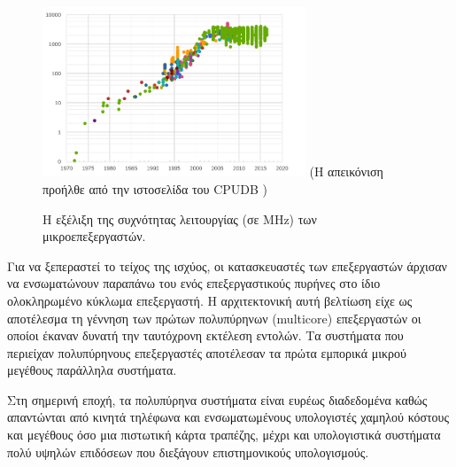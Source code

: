 \begin{figure}[t]
	\centering
	\includegraphics[width=0.7\textwidth]{Figures/cpudb.png}
	\linebreak 
	{\small (Η απεικόνιση προήλθε από την ιστοσελίδα του CPUDB \cite{danowitz2012cpu})}
	\caption{Η εξέλιξη της συχνότητας λειτουργίας (σε MHz) των μικροεπεξεργαστών.}
	\label{fig:CPUDB}
\end{figure}


Για να ξεπεραστεί το τείχος της ισχύος, οι κατασκευαστές των επεξεργαστών άρχισαν να ενσωματώνουν παραπάνω του ενός επεξεργαστικούς πυρήνες στο ίδιο ολοκληρωμένο κύκλωμα επεξεργαστή. Η αρχιτεκτονική αυτή βελτίωση είχε ως αποτέλεσμα τη γέννηση των πρώτων πολυπύρηνων (multicore) επεξεργαστών οι οποίοι έκαναν δυνατή την ταυτόχρονη εκτέλεση εντολών. Τα συστήματα που περιείχαν πολυπύρηνους επεξεργαστές αποτέλεσαν τα πρώτα εμπορικά μικρού μεγέθους παράλληλα συστήματα.

Στη σημερινή εποχή, τα πολυπύρηνα συστήματα είναι ευρέως διαδεδομένα καθώς απαντώνται από κινητά τηλέφωνα και ενσωματωμένους υπολογιστές χαμηλού κόστους και μεγέθους όσο μια πιστωτική κάρτα τραπέζης, μέχρι και υπολογιστικά συστήματα πολύ υψηλών επιδόσεων που διεξάγουν επιστημονικούς υπολογισμούς.



